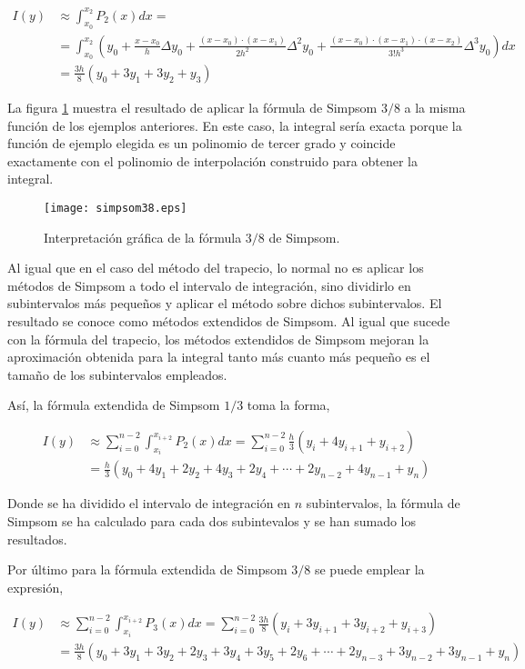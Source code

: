 \begin{align*}
I(y)&\approx \int_{x_0}^{x_2}P_2(x)dx=\\
&=\int_{x_0}^{x_2}\left(y_0+\frac{x-x_0}{h}\Delta y_0+\frac{(x-x_0)\cdot(x-x_1)}{2h^2}\Delta^2 y_0 +\frac{(x-x_0)\cdot(x-x_1)\cdot (x-x_2)}{3!h^3}\Delta^3 y_0\right)dx\\
&= \frac{3h}{8}(y_0+3y_1+3y_2+y_3)
\end{align*}

La figura  \ref{fig:simpsom38} muestra el resultado de aplicar la fórmula de Simpsom $3/8$ a la misma función de los ejemplos anteriores. En este caso, la integral sería exacta porque la función de ejemplo elegida es un polinomio de tercer grado y coincide exactamente con el polinomio de interpolación construido para obtener la integral.

\begin{figure}[h]
\centering
\texttt{[image: simpsom38.eps]}
\caption{Interpretación gráfica de la fórmula $3/8$ de Simpsom.} 
\label{fig:simpsom38}
\end{figure}

Al igual que en el caso del método del trapecio, lo normal no es aplicar los métodos de Simpsom a todo el intervalo de integración, sino dividirlo en subintervalos más pequeños y aplicar el método sobre dichos subintervalos. El resultado se conoce como métodos extendidos de Simpsom. Al igual que sucede con la fórmula del trapecio, los métodos extendidos de Simpsom mejoran la aproximación obtenida para la integral tanto más cuanto más pequeño es el tamaño de los subintervalos empleados. 

Así, la fórmula extendida de Simpsom $1/3$ toma la forma,
 
\begin{align*}
I(y)&\approx \sum_{i=0}^{n-2}\int_{x_i}^{x_{i+2}}P_2(x)dx=\sum_{i=0}^{n-2}\frac{h}{3}(y_i+4y_{i+1}+y_{i+2})\\
&= \frac{h}{3}(y_0+4y_1+2y_2+4y_3+2y_4+\cdots + 2y_{n-2}+4y_{n-1}+y_n)
\end{align*}

Donde se ha dividido el intervalo de integración en $n$ subintervalos, la fórmula de Simpsom se ha calculado para cada dos subintevalos y se han sumado los resultados.

Por último para la fórmula extendida de Simpsom $3/8$ se puede emplear la expresión,

\begin{align*}
I(y)&\approx \sum_{i=0}^{n-2}\int_{x_i}^{x_{i+2}}P_3(x)dx=\sum_{i=0}^{n-2}\frac{3h}{8}(y_i+3y_{i+1}+3y_{i+2}+y_{i+3})\\
&= \frac{3h}{8}(y_0+3y_1+3y_2+2y_3+3y_4+3y_5+2y_6+ \cdots + 2y_{n-3}+3y_{n-2}+3y_{n-1}+y_n)
\end{align*}

